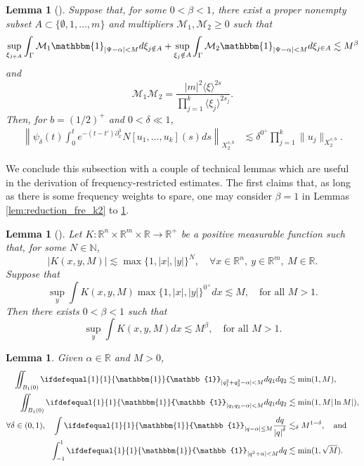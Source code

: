 \documentclass[%
11pt,  reqno]{amsart}
\newcommand{\jap}[1]{\langle #1 \rangle}
\newcommand{\5}{\textup{V}}
\newcommand{\m}[1]{
	\ifdefequal{#1}{1}
	{\mathbbm{#1}}
	{\mathbb{#1}}
}
\newcommand{\les}{\lesssim}
\newtheorem{lemma}[theorem]{Lemma}
\theoremstyle{remark}
\newcommand{\R}{\mathbb{R}}
\numberwithin{equation}{section}
\numberwithin{theorem}{section}
\begin{document}
{		
		\begin{lemma}[{\cite[Lemma 2]{COS}}]\label{lem:fre_tri}
			Suppose that, for some $0<\beta<1$, there exist a proper nonempty subset $A\subset \{\emptyset,1,\dots, m\}$ and multipliers $\mathcal{M}_1,\mathcal{M}_2\ge 0$ such that
			$$
			\sup_{\xi_{j\in A}} \int_{\Gamma} \mathcal{M}_1 \mathbbm{1}_{|\Psi-\alpha|<M} d\xi_{j\notin A} + \sup_{\xi_ j\notin A} \int_{\Gamma} \mathcal{M}_2 \mathbbm{1}_{|\Psi-\alpha|<M} d\xi_{j\in A} \lesssim M^\beta
			$$
			and
			$$
			\mathcal{M}_1\mathcal{M}_2=\frac{|m|^2\jap{\xi}^{2s}}{\prod_{j=1}^k\jap{\xi_{j}}^{2s_j}}.
			$$
            Then, for $b=(1/2)^+$ and $0<\delta\ll 1$,
            \begin{align}
				\left\|\psi_\delta(t)\int_0^te^{-(t-t')\partial_x^3}N[u_1,\dots, u_k](s)ds \right\|_{X^{s,b}_{2}} & \les \delta^{0^+}\prod_{j=1}^k\|u_j\|_{X^{s,b}_{2}}.
			\end{align}
		\end{lemma}
		
		We conclude this subsection with a couple of technical lemmas which are useful in the derivation of frequency-restricted estimates. The first claims that, as long as there is some frequency weights to spare, one may consider $\beta=1$ in Lemmas \ref{lem:reduction_fre_k2} to \ref{lem:fre_tri}.
		
		\begin{lemma}[{\cite[Lemma 3.3]{CLS}}]\label{lem:eta1}
			Let $K:\R^n\times \R^m\times \R\to \R^+$ be a positive measurable function such that, for some $N\in \mathbb{N}$,
			$$
			|K(x,y,M)|\lesssim \max\{1,|x|,|y|\}^N,\quad \forall x\in\R^n,\ y\in \R^m, \ M\in \R.
			$$
			Suppose that
			$$
			\sup_y \int K(x,y,M)\max\{1,|x|,|y|\}^{0^+} dx \lesssim M,\quad \mbox{for all }M>1.
			$$
			Then there exists $0<\beta<1$ such that
			$$
			\sup_y \int K(x,y,M) dx \lesssim M^{\beta},\quad \mbox{for all } M>1.
			$$
		\end{lemma}
		
		
		\begin{lemma}\label{lem:quadraticas}
			Given $\alpha\in \R$ and $M>0$,
			\begin{align}\label{eq:posdef}
				\iint_{B_1(0)} \m 1_{|q_1^2+q_2^2-\alpha|<M}dq_1dq_2 &\lesssim \min(1,M), \\\label{eq:indef}
				\iint_{B_1(0)} \m 1_{|q_1q_2-\alpha|<M}dq_1dq_2 &\lesssim \min(1,M|\ln M|), \\
				\label{eq:singular}
				\forall \delta \in (0,1), \quad \int \m 1_{|q-\alpha| \le M} \frac{dq}{\left|q \right|^{\delta}} &\lesssim_{\delta} M^{1-\delta}, \quad \text{and} \quad \\
				\label{eq:quadratica}
				\int_{-1}^{1} \m 1_{|q^2  +\alpha | < M} dq &\lesssim \min(1,\sqrt M).
			\end{align}
			

\end{lemma}}
\end{document}
